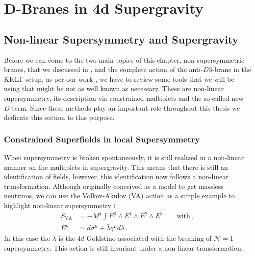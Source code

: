 \documentclass[a4paper,12pt,twoside,openright]{report}
\newcommand{\bea}{\begin{equation}\begin{aligned}}
\newcommand{\eea}{\end{aligned}\end{equation}}
\begin{document}
\chapter{D-Branes in 4d Supergravity}
\label{sec:antiD3}

\section{Non-linear Supersymmetry and Supergravity}
\label{sec:multiplets}
Before we can come to the two main topics of this chapter, non-supersymmetric branes, that we discussed in \cite{Cribiori:2020bgt}, and the complete action of the anti-$D3$-brane in the KKLT setup, as per our work \cite{Cribiori:2019hod}, we have to review some tools that we will be using that might be not as well known as necessary. These are non-linear supersymmetry, its description via constrained multiplets and the so-called new $D$-term. Since these methods play an important role throughout this thesis we dedicate this section to this purpose.
\subsection{Constrained Superfields in local Supersymmetry}
When supersymmetry is broken spontaneously, it is still realized in a non-linear manner on the multiplets in supergravity. This means that there is still an identification of fields, however, this identification now follows a non-linear transformation. Although originally conceived as a model to get massless neutrinos, we can use the Volkov-Akulov (VA) action \cite{Volkov:1972jx} as a simple example to highlight non-linear supersymmetry \cite{Kallosh:2016aep}:
\bea
S_{\text{VA}} &= -M^4 \int E^0 \wedge E^1 \wedge E^2 \wedge E^3\qquad \text{with}\,,\\
E^\mu &= d\sigma^\mu + \bar{\lambda} \gamma^\mu d\lambda\,.
\label{eq:VAorigin}
\eea
In this case the $\lambda$ is the $4d$ Goldstino associated with the breaking of $\mathcal{N}=1$ supersymmetry. This action is still invariant under a non-linear transformation:
\end{document}
